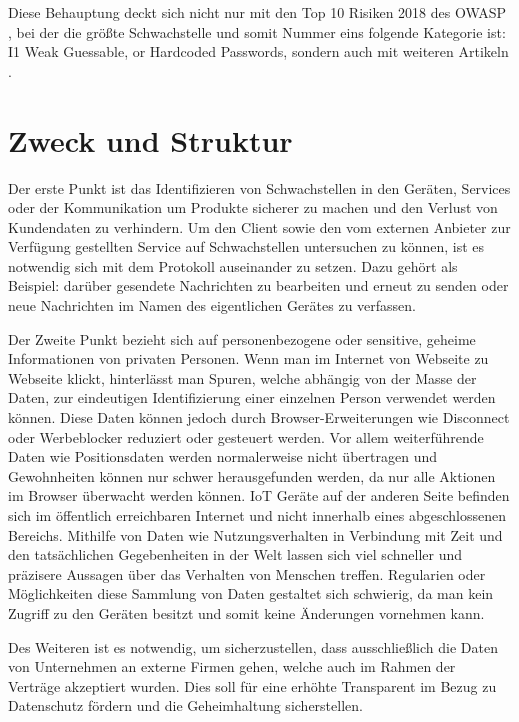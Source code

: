 Diese Behauptung deckt sich nicht nur mit den Top 10 Risiken 2018 des \ac{OWASP} \cite{guzman_2019}, bei der die größte Schwachstelle und somit Nummer eins folgende Kategorie ist: \glqq I1 Weak Guessable, or Hardcoded Passwords\grqq{}, sondern auch mit weiteren Artikeln \cite{eckstein_2018}.

\section{Zweck und Struktur}

    Der erste Punkt ist das Identifizieren von Schwachstellen in den Geräten, Services oder der Kommunikation um Produkte sicherer zu machen und den Verlust von Kundendaten zu verhindern.
    Um den Client sowie den vom externen Anbieter zur Verfügung gestellten Service auf Schwachstellen untersuchen zu können, ist es notwendig sich mit dem Protokoll auseinander zu setzen. Dazu gehört als Beispiel: darüber gesendete Nachrichten zu bearbeiten und erneut zu senden oder neue Nachrichten im Namen des eigentlichen Gerätes zu verfassen.
    
    Der Zweite Punkt bezieht sich auf personenbezogene oder sensitive, geheime Informationen von privaten Personen.
    Wenn man im Internet von Webseite zu Webseite klickt, hinterlässt man Spuren, welche abhängig von der Masse der Daten, zur eindeutigen Identifizierung einer einzelnen Person verwendet werden können. %
    Diese Daten können jedoch durch Browser-Erweiterungen wie Disconnect oder Werbeblocker reduziert oder gesteuert werden. Vor allem weiterführende Daten wie Positionsdaten werden normalerweise nicht übertragen und Gewohnheiten können nur schwer herausgefunden werden, da nur alle Aktionen im Browser überwacht werden können.
    \ac{IoT} Geräte auf der anderen Seite befinden sich im öffentlich erreichbaren Internet und nicht innerhalb eines abgeschlossenen Bereichs. Mithilfe von Daten wie Nutzungsverhalten in Verbindung mit Zeit und den tatsächlichen Gegebenheiten in der Welt lassen sich viel schneller und präzisere Aussagen über das Verhalten von Menschen treffen. Regularien oder Möglichkeiten diese Sammlung von Daten gestaltet sich schwierig, da man kein Zugriff zu den Geräten besitzt und somit keine Änderungen vornehmen kann.
    
    Des Weiteren ist es notwendig, um sicherzustellen, dass ausschließlich die Daten von Unternehmen an externe Firmen gehen, welche auch im Rahmen der Verträge akzeptiert wurden. Dies soll für eine erhöhte Transparent im Bezug zu Datenschutz fördern und die Geheimhaltung sicherstellen.
    
